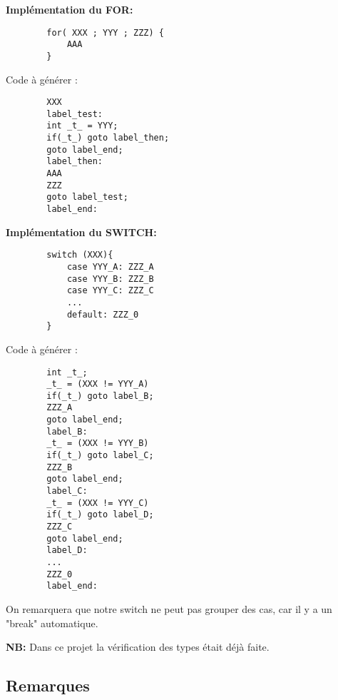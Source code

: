\documentclass[12pt, a4paper]{article}
\begin{document}
\textbf{Implémentation du FOR:}
\begin{codequote}
    \begin{verbatim}
        for( XXX ; YYY ; ZZZ) {
            AAA
        }
    \end{verbatim}
\end{codequote}
Code à générer :
\begin{codequote}
    \begin{verbatim}
        XXX
        label_test:
        int _t_ = YYY;
        if(_t_) goto label_then;
        goto label_end;
        label_then:
        AAA
        ZZZ
        goto label_test;
        label_end:
    \end{verbatim}
\end{codequote}


\textbf{Implémentation du SWITCH:}
\begin{codequote}
    \begin{verbatim}
        switch (XXX){
            case YYY_A: ZZZ_A
            case YYY_B: ZZZ_B
            case YYY_C: ZZZ_C
            ...
            default: ZZZ_0 
        }
    \end{verbatim}
\end{codequote}
Code à générer :
\begin{codequote}
    \begin{verbatim}
        int _t_;
        _t_ = (XXX != YYY_A)
        if(_t_) goto label_B;
        ZZZ_A
        goto label_end;
        label_B:
        _t_ = (XXX != YYY_B)
        if(_t_) goto label_C;
        ZZZ_B
        goto label_end;
        label_C:
        _t_ = (XXX != YYY_C)
        if(_t_) goto label_D;
        ZZZ_C
        goto label_end;
        label_D:
        ...
        ZZZ_0
        label_end:
    \end{verbatim}
\end{codequote}
On remarquera que notre switch ne peut pas grouper des cas, car il y a un "break" automatique.

\textbf{NB:} Dans ce projet la vérification des types était déjà faite.

\subsection*{Remarques}
\end{document}
